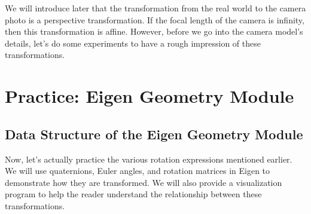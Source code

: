 We will introduce later that the transformation from the real world to the camera photo is a perspective transformation. If the focal length of the camera is infinity, then this transformation is affine. However, before we go into the camera model's details, let's do some experiments to have a rough impression of these transformations.

\section{Practice: Eigen Geometry Module}
\subsection{Data Structure of the Eigen Geometry Module}
Now, let's actually practice the various rotation expressions mentioned earlier. We will use quaternions, Euler angles, and rotation matrices in Eigen to demonstrate how they are transformed. We will also provide a visualization program to help the reader understand the relationship between these transformations.

